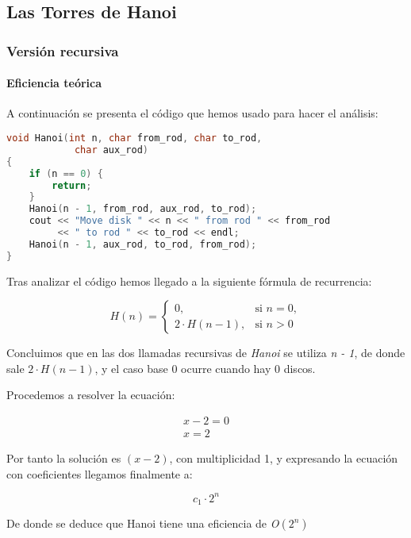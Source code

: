 \documentclass[a4paper,12pt]{article} %
\begin{document}
\subsection{Las Torres de Hanoi}

\subsubsection{Versión recursiva}
\paragraph{Eficiencia teórica}

A continuación se presenta el código que hemos usado para hacer el análisis:

\begin{lstlisting}[language=C, caption={Código de Hanoi recursivo}]
void Hanoi(int n, char from_rod, char to_rod,
            char aux_rod)
{
    if (n == 0) {
        return;
    }
    Hanoi(n - 1, from_rod, aux_rod, to_rod);
    cout << "Move disk " << n << " from rod " << from_rod
         << " to rod " << to_rod << endl;
    Hanoi(n - 1, aux_rod, to_rod, from_rod);
}
\end{lstlisting}

Tras analizar el código hemos llegado a la siguiente fórmula de recurrencia:

\[
	H(n)=
	\begin{cases}
		0,             & \text{si } n = 0, \\[6pt]
		2\cdot H(n-1), & \text{si } n > 0
	\end{cases}
\]

Concluimos que en las dos llamadas recursivas de \textit{Hanoi}
se utiliza \textit{n - 1}, de donde sale $2\cdot H(n-1)$, y el caso base
0 ocurre cuando hay 0 discos.

Procedemos a resolver la ecuación:

\begin{align*}
	x - 2 = 0 \\
	x = 2
\end{align*}

Por tanto la solución es $(x -2)$, con multiplicidad 1, y expresando la
ecuación con coeficientes llegamos finalmente a:

\begin{equation*}
	c_{1}\cdot 2^{n}
\end{equation*}

De donde se deduce que Hanoi tiene una eficiencia de \textit{O}$(2^{n})$
\end{document}
